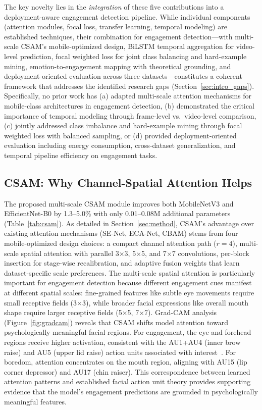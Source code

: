 \documentclass[sensors,article,submit,pdftex,moreauthors]{Definitions/mdpi}
\begin{document}
The key novelty lies in the \textit{integration} of these five contributions into a deployment-aware engagement detection pipeline. While individual components (attention modules, focal loss, transfer learning, temporal modeling) are established techniques, their combination for engagement detection---with multi-scale CSAM's mobile-optimized design, BiLSTM temporal aggregation for video-level prediction, focal weighted loss for joint class balancing and hard-example mining, emotion-to-engagement mapping with theoretical grounding, and deployment-oriented evaluation across three datasets---constitutes a coherent framework that addresses the identified research gaps (Section~\ref{sec:intro_gaps}). Specifically, no prior work has (a) adapted multi-scale attention mechanisms for mobile-class architectures in engagement detection, (b) demonstrated the critical importance of temporal modeling through frame-level vs.\ video-level comparison, (c) jointly addressed class imbalance and hard-example mining through focal weighted loss with balanced sampling, or (d) provided deployment-oriented evaluation including energy consumption, cross-dataset generalization, and temporal pipeline efficiency on engagement tasks.

\subsection{CSAM: Why Channel-Spatial Attention Helps}

The proposed multi-scale CSAM module improves both MobileNetV3 and EfficientNet-B0 by 1.3--5.0\% with only 0.01--0.08M additional parameters (Table~\ref{tab:csam}). As detailed in Section~\ref{sec:method}, CSAM's advantage over existing attention mechanisms (SE-Net, ECA-Net, CBAM) stems from four mobile-optimized design choices: a compact channel attention path ($r=4$), multi-scale spatial attention with parallel 3$\times$3, 5$\times$5, and 7$\times$7 convolutions, per-block insertion for stage-wise recalibration, and adaptive fusion weights that learn dataset-specific scale preferences. The multi-scale spatial attention is particularly important for engagement detection because different engagement cues manifest at different spatial scales: fine-grained features like subtle eye movements require small receptive fields (3$\times$3), while broader facial expressions like overall mouth shape require larger receptive fields (5$\times$5, 7$\times$7). Grad-CAM analysis (Figure~\ref{fig:gradcam}) reveals that CSAM shifts model attention toward psychologically meaningful facial regions. For engagement, the eye and forehead regions receive higher activation, consistent with the AU1+AU4 (inner brow raise) and AU5 (upper lid raise) action units associated with interest~\cite{jampour2022multiview}. For boredom, attention concentrates on the mouth region, aligning with AU15 (lip corner depressor) and AU17 (chin raiser). This correspondence between learned attention patterns and established facial action unit theory provides supporting evidence that the model's engagement predictions are grounded in psychologically meaningful features.
\end{document}
